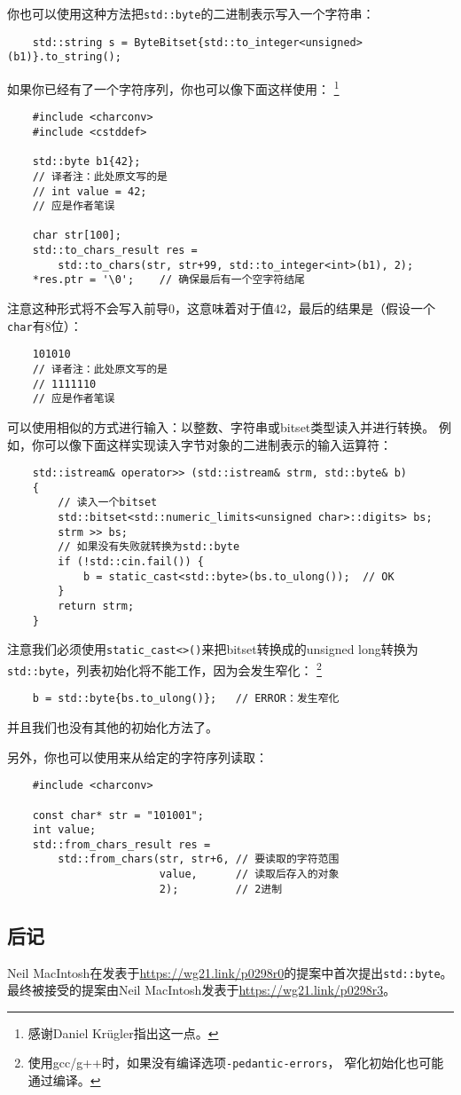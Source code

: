 你也可以使用这种方法把\texttt{std::byte}的二进制表示写入一个字符串：
\begin{lstlisting}
    std::string s = ByteBitset{std::to_integer<unsigned>(b1)}.to_string();
\end{lstlisting}
如果你已经有了一个字符序列，你也可以像下面这样使用：
\footnote{感谢Daniel Krügler指出这一点。}
\begin{lstlisting}
    #include <charconv>
    #include <cstddef>

    std::byte b1{42};
    // 译者注：此处原文写的是
    // int value = 42;
    // 应是作者笔误

    char str[100];
    std::to_chars_result res =
        std::to_chars(str, str+99, std::to_integer<int>(b1), 2);
    *res.ptr = '\0';    // 确保最后有一个空字符结尾
\end{lstlisting}
注意这种形式将不会写入前导0，这意味着对于值42，最后的结果是（假设一个\texttt{char}有8位）：
\begin{lstlisting}
    101010
    // 译者注：此处原文写的是
    // 1111110
    // 应是作者笔误
\end{lstlisting}
可以使用相似的方式进行输入：以整数、字符串或bitset类型读入并进行转换。
例如，你可以像下面这样实现读入字节对象的二进制表示的输入运算符：
\begin{lstlisting}
    std::istream& operator>> (std::istream& strm, std::byte& b)
    {
        // 读入一个bitset
        std::bitset<std::numeric_limits<unsigned char>::digits> bs;
        strm >> bs;
        // 如果没有失败就转换为std::byte
        if (!std::cin.fail()) {
            b = static_cast<std::byte>(bs.to_ulong());  // OK
        }
        return strm;
    }
\end{lstlisting}
注意我们必须使用\texttt{static\_cast<>()}来把bitset转换成的unsigned long转换为
\texttt{std::byte}，列表初始化将不能工作，因为会发生窄化：
\footnote{使用gcc/g++时，如果没有编译选项\texttt{-pedantic-errors}，
窄化初始化也可能通过编译。}
\begin{lstlisting}
    b = std::byte{bs.to_ulong()};   // ERROR：发生窄化
\end{lstlisting}
并且我们也没有其他的初始化方法了。

另外，你也可以使用来从给定的字符序列读取：
\begin{lstlisting}
    #include <charconv>

    const char* str = "101001";
    int value;
    std::from_chars_result res =
        std::from_chars(str, str+6, // 要读取的字符范围
                        value,      // 读取后存入的对象
                        2);         // 2进制
\end{lstlisting}

\subsection{后记}
Neil MacIntosh在发表于\url{https://wg21.link/p0298r0}的提案中首次提出\texttt{std::byte}。
最终被接受的提案由Neil MacIntosh发表于\url{https://wg21.link/p0298r3}。

